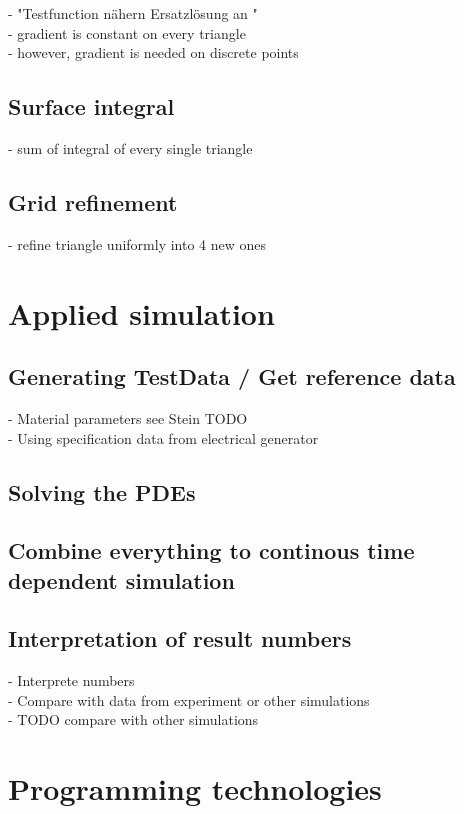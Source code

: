 \documentclass[parskip=half, titlepage=yes, 12pt, BCOR=12mm, DIV=calc]{scrartcl}
\begin{document}
- "Testfunction nähern Ersatzlösung an " \\
- gradient is constant on every triangle \\
- however, gradient is needed on discrete points \\

\subsection{Surface integral}
- sum of integral of every single triangle \\

\subsection{Grid refinement}
- refine triangle uniformly into 4 new ones \\




\section{Applied simulation}
\subsection{Generating TestData / Get reference data}
- Material parameters see Stein TODO \\
- Using specification data from electrical generator \\

\subsection{Solving the PDEs}
\subsection{Combine everything to continous time dependent simulation}
\subsection{Interpretation of result numbers}
- Interprete numbers \\
- Compare with data from experiment or other simulations \\
- TODO compare with other simulations \\

\section{Programming technologies}
\end{document}

